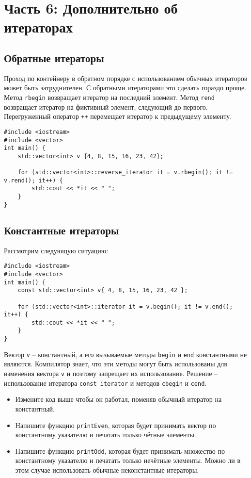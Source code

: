 \documentclass{article}
\begin{document}
\newpage
\section*{Часть 6: Дополнительно об итераторах}
\subsection*{Обратные итераторы}
Проход по контейнеру в обратном порядке с использованием обычных итераторов может быть затруднителен. С обратными итераторами это сделать гораздо проще. Метод \texttt{rbegin} возвращает итератор на последний элемент. Метод \texttt{rend} возвращает итератор на фиктивный элемент, следующий до первого. Перегруженный оператор \texttt{++} перемещает итератор к предыдущему элементу.
\begin{lstlisting}
#include <iostream>
#include <vector>
int main() {
    std::vector<int> v {4, 8, 15, 16, 23, 42};
    
    for (std::vector<int>::reverse_iterator it = v.rbegin(); it != v.rend(); it++) {
        std::cout << *it << " ";
    }
}
\end{lstlisting}
\subsection*{Константные итераторы}
Рассмотрим следующую ситуацию:
\begin{lstlisting}
#include <iostream>
#include <vector>
int main() {
    const std::vector<int> v{ 4, 8, 15, 16, 23, 42 };

    for (std::vector<int>::iterator it = v.begin(); it != v.end(); it++) {
        std::cout << *it << " ";
    }
}
\end{lstlisting}
Вектор \texttt{v} -- константный, а его вызываемые методы \texttt{begin} и \texttt{end} константными не являются. Компилятор знает, что эти методы могут быть использованы для изменения вектора \texttt{v} и поэтому запрещает их использование. Решение -- использование итератора \texttt{const\_iterator} и методов \texttt{cbegin} и \texttt{cend}.

\begin{itemize}
\item Измените код выше чтобы он работал, поменяв обычный итератор на константный.
\item Напишите функцию \texttt{printEven}, которая будет принимать вектор по константному указателю и печатать только чётные элементы.
\item Напишите функцию \texttt{printOdd}, которая будет принимать множество по константному указателю и печатать только нечётные элементы. Можно ли в этом случае использовать обычные неконстантные итераторы.
\end{itemize}
\end{document}
